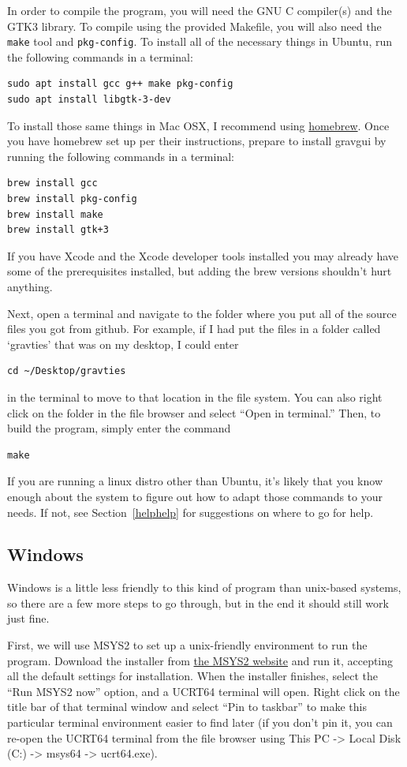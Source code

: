 \documentclass{pfpe-manual}
\begin{document}
In order to compile the program, you will need the GNU C compiler(s) and the GTK3 library. To compile using the provided Makefile, you will also need the \texttt{make} tool and \texttt{pkg-config}. To install all of the necessary things in Ubuntu, run the following commands in a terminal:
\begin{verbatim}
sudo apt install gcc g++ make pkg-config
sudo apt install libgtk-3-dev
\end{verbatim}

To install those same things in Mac OSX, I recommend using \href{https://brew.sh/}{homebrew}. Once you have homebrew set up per their instructions, prepare to install gravgui by running the following commands in a terminal:
\begin{verbatim}
brew install gcc
brew install pkg-config
brew install make
brew install gtk+3
\end{verbatim}
If you have Xcode and the Xcode developer tools installed you may already have some of the prerequisites installed, but adding the brew versions shouldn't hurt anything.

Next, open a terminal and navigate to the folder where you put all of the source files you got from github. For example, if I had put the files in a folder called `gravties' that was on my desktop, I could enter 
\begin{verbatim}
cd ~/Desktop/gravties
\end{verbatim}
in the terminal to move to that location in the file system. You can also right click on the folder in the file browser and select ``Open in terminal.'' Then, to build the program, simply enter the command
\begin{verbatim}
make
\end{verbatim}

If you are running a linux distro other than Ubuntu, it's likely that you know enough about the system to figure out how to adapt those commands to your needs. If not, see Section~\ref{helphelp} for suggestions on where to go for help.

\subsection{Windows}
\label{inst:wind}
Windows is a little less friendly to this kind of program than unix-based systems, so there are a few more steps to go through, but in the end it should still work just fine. 

First, we will use MSYS2 to set up a unix-friendly environment to run the program. Download the installer from \href{https://www.msys2.org/}{the MSYS2 website} and run it, accepting all the default settings for installation. When the installer finishes, select the ``Run MSYS2 now'' option, and a UCRT64 terminal will open. Right click on the title bar of that terminal window and select ``Pin to taskbar'' to make this particular terminal environment easier to find later (if you don't pin it, you can re-open the UCRT64 terminal from the file browser using This PC -> Local Disk (C:) -> msys64 -> ucrt64.exe).
\end{document}
